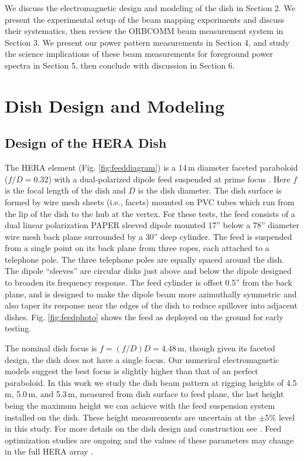 \documentclass{emulateapj}
\begin{document}
We discuss the electromagnetic design and modeling of the dish in Section 2. We present the 
experimental setup of the beam mapping experiments and discuss their systematics, then 
review the ORBCOMM beam measurement system in Section 3. We present our power pattern 
measurements in Section 4, and study the science implications of these beam measurements for foreground power spectra in Section 5, then conclude with discussion in Section 6.

\section{Dish Design and Modeling}

\subsection{Design of the HERA Dish}

The HERA element (Fig. \ref{fig:feeddiagram}) is a 14\,m diameter faceted paraboloid ($ f/D=0.32$) with a dual-polarized dipole feed suspended at prime focus \citep{dishmemo}. Here $f$ is the focal length of the dish and $D$ is the dish diameter. The dish surface is formed by wire mesh sheets (i.e., facets) mounted on PVC tubes which run from the lip of the dish to the hub at the vertex. For these tests, the feed consists of a dual linear polarization PAPER sleeved dipole mounted 17'' below a 78'' diameter wire mesh back plane surrounded by a 30'' deep cylinder. The feed is suspended from a single point on its back plane from three ropes, each attached to a telephone pole. The three telephone poles are equally spaced around the dish. The dipole ``sleeves'' are circular disks just above and below the dipole designed to broaden its frequency response. The feed cylinder is offset 0.5'' from the back plane, and is designed to make the dipole beam more azimuthally symmetric and also taper its response near the edges of the dish to reduce spillover into adjacent dishes. Fig. \ref{fig:feedphoto} shows the feed as deployed on the ground for early testing. 

The nominal dish focus is $f=(f/D)D=4.48$\,m, though given its faceted design, the dish does not have a single focus. Our numerical electromagnetic models suggest the best focus is slightly higher than that of an perfect paraboloid. In this work we study the dish beam pattern at rigging heights of 4.5\,m, 5.0\,m, and 5.3\,m, measured from dish surface to feed plane, the last height being the maximum height we can achieve with the feed suspension system installed on the dish. These height measurements are uncertain at the $\pm5\%$ level in this study. For more details on the dish design and construction see \citet{deboer16}. Feed optimization studies are ongoing and the values of these parameters may change in the full HERA array \citep{feedoptimizationmemo}. 
\end{document}
